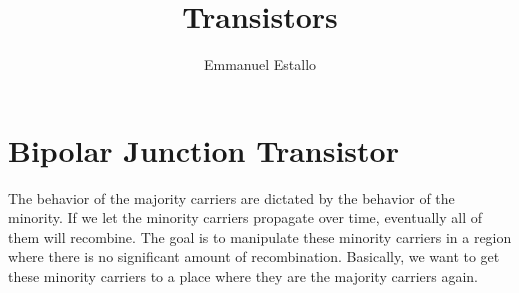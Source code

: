 \documentclass{article}
\title{Transistors}
\author{Emmanuel Estallo}
\begin{document}
\boldmath 
\maketitle 

\section{Bipolar Junction Transistor}
\noindent 
The behavior of the majority carriers are dictated by the behavior of the minority.
If we let the minority carriers propagate over time, eventually all of them will 
recombine. The goal is to manipulate these minority carriers in a region where there 
is no significant amount of recombination. Basically, we want to get these minority 
carriers to a place where they are the majority carriers again. 
\end{document}
